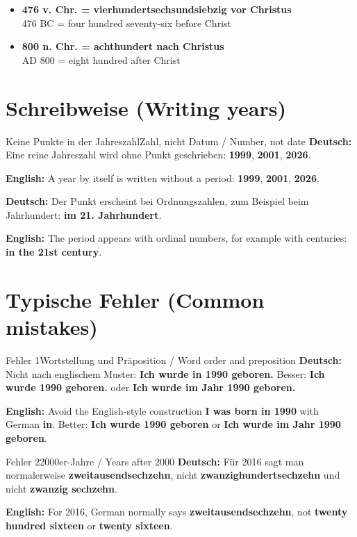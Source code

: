 \documentclass[a4paper,11pt]{article}
\newcommand{\GermanText}[1]{\textbf{Deutsch: }#1\par}
\newcommand{\EnglishText}[1]{{\small\color{SoftGray}\textbf{English: }#1\par}}
\newcommand{\ExampleItem}[2]{\item \textbf{#1}\\{\small\color{SoftGray}#2}}
\begin{document}
\begin{exbox}
\begin{itemize}
\ExampleItem{476 v. Chr. = vierhundertsechsundsiebzig vor Christus}{476 BC = four hundred seventy-six before Christ}
\ExampleItem{800 n. Chr. = achthundert nach Christus}{AD 800 = eight hundred after Christ}
\end{itemize}
\end{exbox}

\section{Schreibweise \textnormal{(Writing years)}}

\begin{grammarentry}{Keine Punkte in der Jahreszahl}{Zahl, nicht Datum / Number, not date}
\GermanText{Eine reine Jahreszahl wird ohne Punkt geschrieben: \textbf{1999}, \textbf{2001}, \textbf{2026}.}
\EnglishText{A year by itself is written without a period: \textbf{1999}, \textbf{2001}, \textbf{2026}.}

\GermanText{Der Punkt erscheint bei Ordnungszahlen, zum Beispiel beim Jahrhundert: \textbf{im 21. Jahrhundert}.}
\EnglishText{The period appears with ordinal numbers, for example with centuries: \textbf{in the 21st century}.}
\end{grammarentry}

\section{Typische Fehler \textnormal{(Common mistakes)}}

\begin{grammarentry}{Fehler 1}{Wortstellung und Präposition / Word order and preposition}
\GermanText{Nicht nach englischem Muster: \textbf{Ich wurde in 1990 geboren.} Besser: \textbf{Ich wurde 1990 geboren.} oder \textbf{Ich wurde im Jahr 1990 geboren.}}
\EnglishText{Avoid the English-style construction \textbf{I was born in 1990} with German \textbf{in}. Better: \textbf{Ich wurde 1990 geboren} or \textbf{Ich wurde im Jahr 1990 geboren}.}
\end{grammarentry}

\begin{grammarentry}{Fehler 2}{2000er-Jahre / Years after 2000}
\GermanText{Für 2016 sagt man normalerweise \textbf{zweitausendsechzehn}, nicht \textbf{zwanzighundertsechzehn} und nicht \textbf{zwanzig sechzehn}.}
\EnglishText{For 2016, German normally says \textbf{zweitausendsechzehn}, not \textbf{twenty hundred sixteen} or \textbf{twenty sixteen}.}
\end{grammarentry}
\end{document}
